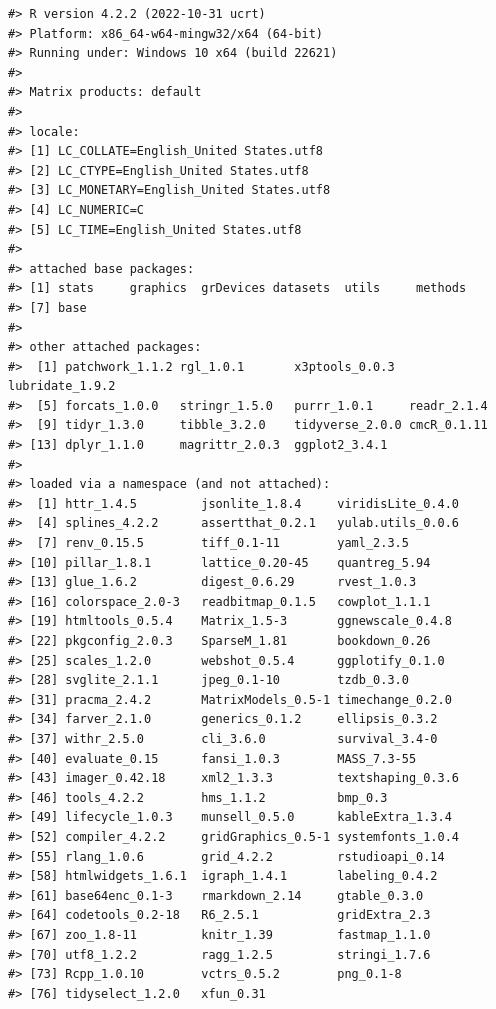 \documentclass[11pt,]{isuthesis}
\begin{document}
\begin{verbatim}
#> R version 4.2.2 (2022-10-31 ucrt)
#> Platform: x86_64-w64-mingw32/x64 (64-bit)
#> Running under: Windows 10 x64 (build 22621)
#> 
#> Matrix products: default
#> 
#> locale:
#> [1] LC_COLLATE=English_United States.utf8 
#> [2] LC_CTYPE=English_United States.utf8   
#> [3] LC_MONETARY=English_United States.utf8
#> [4] LC_NUMERIC=C                          
#> [5] LC_TIME=English_United States.utf8    
#> 
#> attached base packages:
#> [1] stats     graphics  grDevices datasets  utils     methods  
#> [7] base     
#> 
#> other attached packages:
#>  [1] patchwork_1.1.2 rgl_1.0.1       x3ptools_0.0.3  lubridate_1.9.2
#>  [5] forcats_1.0.0   stringr_1.5.0   purrr_1.0.1     readr_2.1.4    
#>  [9] tidyr_1.3.0     tibble_3.2.0    tidyverse_2.0.0 cmcR_0.1.11    
#> [13] dplyr_1.1.0     magrittr_2.0.3  ggplot2_3.4.1  
#> 
#> loaded via a namespace (and not attached):
#>  [1] httr_1.4.5         jsonlite_1.8.4     viridisLite_0.4.0 
#>  [4] splines_4.2.2      assertthat_0.2.1   yulab.utils_0.0.6 
#>  [7] renv_0.15.5        tiff_0.1-11        yaml_2.3.5        
#> [10] pillar_1.8.1       lattice_0.20-45    quantreg_5.94     
#> [13] glue_1.6.2         digest_0.6.29      rvest_1.0.3       
#> [16] colorspace_2.0-3   readbitmap_0.1.5   cowplot_1.1.1     
#> [19] htmltools_0.5.4    Matrix_1.5-3       ggnewscale_0.4.8  
#> [22] pkgconfig_2.0.3    SparseM_1.81       bookdown_0.26     
#> [25] scales_1.2.0       webshot_0.5.4      ggplotify_0.1.0   
#> [28] svglite_2.1.1      jpeg_0.1-10        tzdb_0.3.0        
#> [31] pracma_2.4.2       MatrixModels_0.5-1 timechange_0.2.0  
#> [34] farver_2.1.0       generics_0.1.2     ellipsis_0.3.2    
#> [37] withr_2.5.0        cli_3.6.0          survival_3.4-0    
#> [40] evaluate_0.15      fansi_1.0.3        MASS_7.3-55       
#> [43] imager_0.42.18     xml2_1.3.3         textshaping_0.3.6 
#> [46] tools_4.2.2        hms_1.1.2          bmp_0.3           
#> [49] lifecycle_1.0.3    munsell_0.5.0      kableExtra_1.3.4  
#> [52] compiler_4.2.2     gridGraphics_0.5-1 systemfonts_1.0.4 
#> [55] rlang_1.0.6        grid_4.2.2         rstudioapi_0.14   
#> [58] htmlwidgets_1.6.1  igraph_1.4.1       labeling_0.4.2    
#> [61] base64enc_0.1-3    rmarkdown_2.14     gtable_0.3.0      
#> [64] codetools_0.2-18   R6_2.5.1           gridExtra_2.3     
#> [67] zoo_1.8-11         knitr_1.39         fastmap_1.1.0     
#> [70] utf8_1.2.2         ragg_1.2.5         stringi_1.7.6     
#> [73] Rcpp_1.0.10        vctrs_0.5.2        png_0.1-8         
#> [76] tidyselect_1.2.0   xfun_0.31
\end{verbatim}
\end{document}
